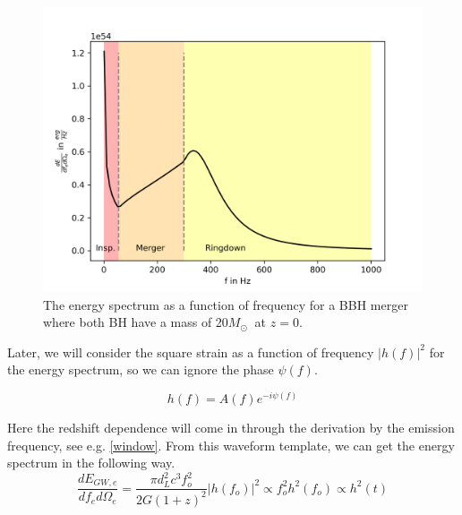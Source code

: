 \begin{figure}
    \centering
    \includegraphics[width=1\linewidth]{Images/dE_df_of_f.png}
    \caption{The energy spectrum as a function of frequency for a BBH merger where both BH have a mass of 20$M_\odot\ $ at $z=0$. }
    \label{dE_df_f}
\end{figure} 


Later, we will consider the square strain as a function of frequency $|h(f)|^2$ for the energy spectrum, so we can ignore the phase $\psi(f)$.

\begin{equation}
    h(f)=A(f)e^{-i\psi(f)}
\end{equation}


Here the redshift dependence will come in through the derivation by the emission 
frequency, see e.g. \ref{window}. From this waveform template, we can get the energy 
spectrum in the following way.
\begin{equation}
    \frac{dE_{GW,e}}{df_e d\Omega_e} = \frac{\pi d_L^2 c^3f_o^2}{2G(1+z)^2} | h(f_o)| ^2 \propto f_o^2h^2(f_o) \propto h^2(t)
\end{equation}


